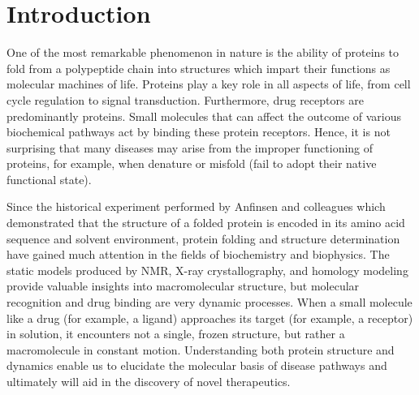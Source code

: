 \chapter{Introduction}


One of the most remarkable phenomenon in nature is the ability of proteins to fold from a polypeptide chain into structures which impart their functions as molecular machines of life. Proteins play a key role in all aspects of life, from cell cycle regulation to signal transduction.  Furthermore, drug receptors are predominantly proteins.  Small molecules that can affect the outcome of various biochemical pathways act by binding these protein receptors. Hence, it is not surprising that many diseases may arise from the improper functioning of proteins, for example, when denature or misfold (fail to adopt their native functional state).

Since the historical experiment performed by Anfinsen and colleagues which demonstrated that the structure of a folded protein is encoded in its amino acid sequence and solvent environment, protein folding and structure determination have gained much attention in the fields of biochemistry and biophysics.  The static models produced by NMR, X-ray crystallography, and homology modeling provide valuable insights into macromolecular structure, but molecular recognition and drug binding are very dynamic processes.  When a small molecule like a drug (for example, a ligand) approaches its target (for example, a receptor) in solution, it encounters not a single, frozen structure, but rather a macromolecule in constant motion. Understanding both protein structure and dynamics enable us to elucidate the molecular basis of disease pathways and ultimately will aid in the discovery of novel therapeutics. 

